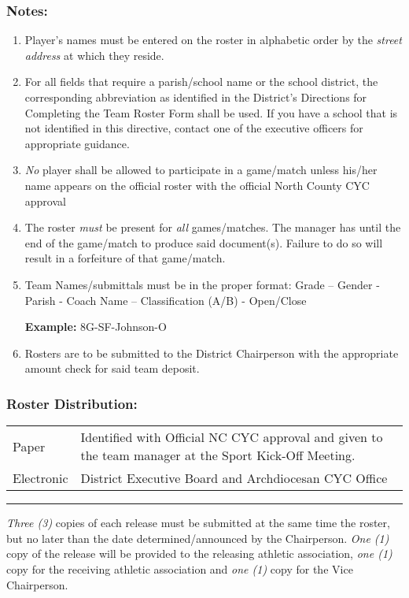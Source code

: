 \subsubsection{Notes:}
\begin{enumerate}[1.]
        \item Player’s names must be entered on the roster in alphabetic order by the {\em street address} at which they reside.
        \item For all fields that require a parish/school name or the school district, the corresponding abbreviation as identified in the District’s Directions for Completing the Team Roster Form shall be used.  If you have a school that is not identified in this directive, contact one of the executive officers for appropriate guidance.
        \item {\em No} player shall be allowed to participate in a game/match unless his/her name appears on the official roster with the official North County CYC approval
        \item The roster {\em must} be present for {\em all} games/matches.  The manager has until the end of the game/match to produce said document(s).  Failure to do so will result in a forfeiture of that game/match.
        \item Team Names/submittals must be in the proper format: Grade – Gender  -  Parish  -  Coach Name  – Classification (A/B) - Open/Close
            
        \textbf{Example:} \textsf{8G-SF-Johnson-O}

        \item Rosters are to be submitted to the District Chairperson with the appropriate amount check for said team deposit.
\end{enumerate}
    
\subsubsection{Roster Distribution:}
\begin{tabular}{l p{9cm}}
    Paper & Identified with Official NC CYC approval and given to the team manager at the Sport Kick-Off Meeting. \\
    Electronic & District Executive Board and Archdiocesan CYC Office \\
\end{tabular}
\plainbreak{1}
{\em Three (3)} copies of each release must be submitted at the same time the roster, but no later than the date determined/announced by the Chairperson.   {\em One (1)} copy of the release will be provided to the releasing athletic association, {\em one (1)} copy for the receiving athletic association and {\em one (1)} copy for the Vice Chairperson.

